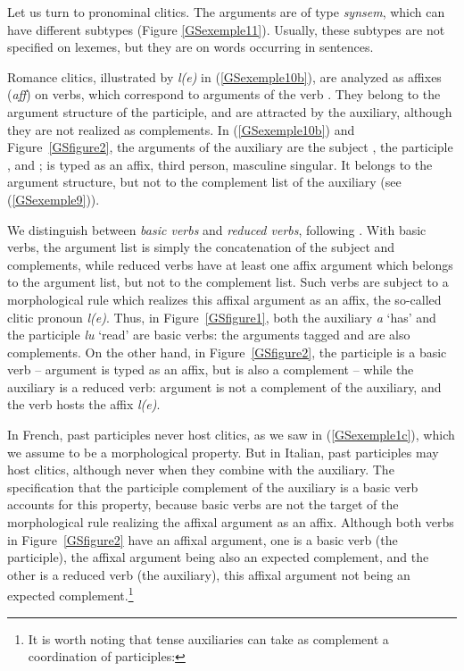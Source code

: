 {Let us turn to pronominal clitics. The arguments are of type \emph{synsem}, which can have different subtypes (Figure \ref{GSexemple11}). Usually, these subtypes are not specified on lexemes, but they are on
words occurring in sentences.

Romance clitics, illustrated by \emph{l(e)} in (\ref{GSexemple10b}), are analyzed as affixes (\emph{aff}) on verbs, which correspond to arguments of the verb \citep{MS97a-u}. They belong to the argument structure of the participle, and are attracted by the auxiliary, although they are not realized as complements. In (\ref{GSexemple10b}) and Figure~\ref{GSfigure2}, the arguments of the auxiliary are the subject , the participle , and ;  is typed as an affix, third person, masculine singular. It belongs to the argument structure, but not to the complement list of the auxiliary (see (\ref{GSexemple9})).


We distinguish between \emph{basic verbs} and \emph{reduced verbs}, following \cite{AGS1998}. With basic verbs, the argument list is simply the concatenation of the subject and complements, while reduced verbs have at least one affix argument which belongs to the argument list, but not to the complement list. Such verbs are subject to a morphological rule which realizes this affixal argument as an affix, the so-called clitic pronoun \emph{l(e)}. Thus, in Figure~\ref{GSfigure1}, both the auxiliary \emph{a} `has' and the participle \emph{lu} `read' are basic verbs: the arguments tagged  and  are also complements. On the other hand, in Figure~\ref{GSfigure2}, the participle is a basic verb -- argument  is typed as an affix, but is also a complement -- while the auxiliary is a reduced verb: argument  is not a complement of the auxiliary, and the verb hosts the affix \emph{l(e)}.

In French, past participles never host clitics, as we saw in (\ref{GSexemple1c}), which we assume to be a morphological property. But in Italian, past participles may host clitics, although never when they combine
with the auxiliary. The specification that the participle complement of the auxiliary is a basic verb accounts for this property, because basic verbs are not the target of the morphological rule realizing the affixal argument as an affix. Although both verbs in Figure~\ref{GSfigure2} have an affixal argument, one is a basic verb (the participle), the affixal argument being also an expected complement, and the other is a reduced verb (the auxiliary), this affixal argument not being an expected complement.\footnote{It is worth noting that tense auxiliaries can take as complement a coordination of participles:
	
}}
